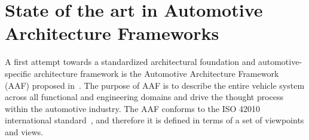 \section{State of the art in Automotive Architecture Frameworks}
A first attempt towards a standardized architectural foundation and automotive-specific
architecture framework is the Automotive
Architecture Framework (AAF) proposed in~\cite{Broy}. 
The purpose of AAF is to describe the entire vehicle system
across all functional and engineering domains and drive the thought process within the
automotive industry.
The AAF conforms to the ISO 42010 international standard~\cite{42010}, and therefore it is defined in terms of a set of viewpoints and views. 
%
%
%
%
%

